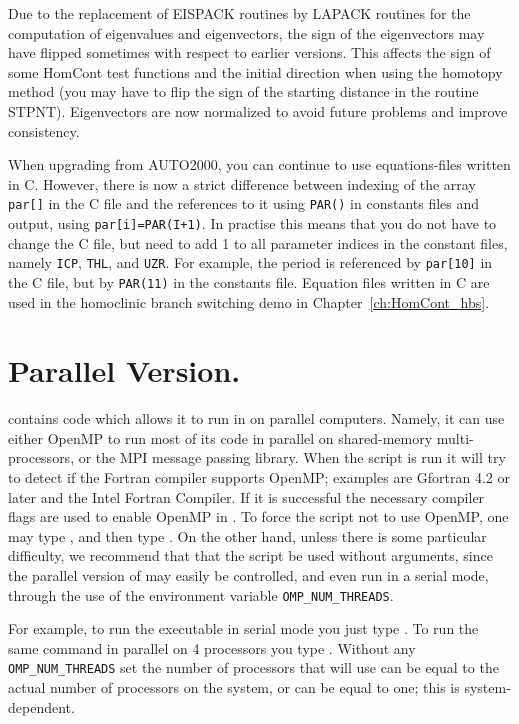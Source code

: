 \documentclass[12pt]{report}
\begin{document}
Due to the replacement of EISPACK routines by LAPACK routines for the
computation of eigenvalues and eigenvectors, the sign of the
eigenvectors may have flipped sometimes with respect to earlier
versions. This affects the sign of some {\cal HomCont}
test functions and the initial direction when using the homotopy
method (you may have to flip the sign of the starting distance
in the routine STPNT). Eigenvectors are now normalized to avoid
future problems and improve consistency.

When upgrading from {\cal AUTO2000}, you can continue to use
equations-files written in C. However, there is now a strict
difference between indexing of the array {\tt par[]} in the
C file and the references to it using {\tt PAR()} in constants
files and output, using {\tt par[i]=PAR(I+1)}. In practise this
means that you do not have to change the C file, but need to
add 1 to all parameter indices in the constant files, namely
{\tt ICP}, {\tt THL}, and {\tt UZR}. For example,
the period is referenced by {\tt par[10]} in the C file,
but by {\tt PAR(11)} in the constants file. Equation files
written in C are used in the homoclinic branch switching
demo in Chapter~\ref{ch:HomCont_hbs}.
 
\section{ Parallel Version.} \label{sec:Parallel}
\AUTO contains code which allows
it to run in on parallel computers.  Namely,
it can use either OpenMP to run most of its code in parallel
on shared-memory multi-processors, or the MPI message passing
library.
When the  script is run it will try to
detect if the Fortran compiler supports OpenMP; examples
are Gfortran 4.2 or later and the Intel Fortran Compiler.
If it is successful the necessary compiler flags are used
to enable OpenMP in \AUTO.
To force the  script not to use OpenMP,
one may type ,
and then type .
On the other hand, unless there is some
particular difficulty, we recommend that that the 
 script be used without arguments, since the
parallel version of \AUTO may easily be controlled,
and even run in a serial mode,  
through the use of the environment variable {\tt OMP\_NUM\_THREADS}.

For example, to run the \AUTO executable 
in serial mode you just type .
To run the same command in parallel on 4 processors you type 
. Without any {\tt OMP\_NUM\_THREADS}
set the number of processors that \AUTO will use can be equal to the
actual number of processors on the system, or can be equal to one;
this is system-dependent.
\end{document}
